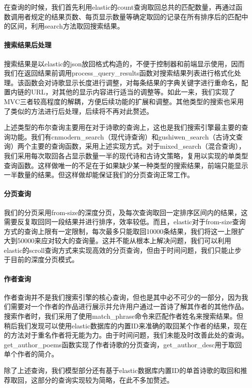 \documentclass[a4paper, 10pt]{article}
\begin{document}
在查询的时候，我们首先利用elastic的count查询取回总共的匹配数量，再通过函数调用者规定的结果页数、每页显示数量等确定取回的记录在所有排序后的匹配中的区间，利用search方法取回搜索结果。

\paragraph*{搜索结果后处理} 搜索结果是以elastic的json放回格式构造的，不便于控制器和前端显示使用，因而我们在返回结果前调用process\_query\_results函数对搜索结果列表进行格式化处理。该函数会对诗歌显示长度进行调整，对每条结果的字典关键字进行重命名，配置内链的URL，对其他的显示内容进行适当的调整等。如此一来，我们实现了MVC三者较高程度的解耦，方便后续功能的扩展和调整。其他类型的搜索也采用了类似的方法进行后处理，后续将不再对此赘述。

上述类型的布尔查询主要用在对于诗歌的查询上，这也是我们搜索引擎最主要的查询功能。我们有cnmodern\_search（现代诗查询）和gushiwen\_search（古诗文查询）两个主要的查询函数，采用上述实现方式。对于mixed\_search（混合查询），我们采用每次取回各占显示数量一半的现代诗和古诗文策略，复用以实现的单类型查询函数。这样做唯一的不足在于如果缺少某一种类型的搜索结果，前端只能显示一半数量的结果。但这样做却能保证我们的分页查询正常工作。

\paragraph*{分页查询} 我们的分页采用from-size的深度分页，及每次查询取回一定排序区间内的结果，这需要反复取回同一段结果并进行排序，效率较低。而且，elastic对于from-size查询方式的查询上限有一定限制，每次最多只能取回10000条结果，我们将这一上限扩大到50000来应对较大的查询量。这并不能从根本上解决问题，我们可以利用elastic的scroll查询方式来实现高效的分页查询，但由于时间问题，我们只能止步于目前的深度分页模式。

\paragraph*{作者查询} 作者查询并不是我们搜索引擎的核心查询，但也是其中必不可少的一部分，因为我们需要对一个作者的作品进行展示并允许用户通过一首诗了解其作者的其他作品。搜索作者时，我们采用了使用match\_phrase命令来匹配作者姓名来搜索结果。但稍后我们发现可以使用elastic数据库的内置ID来准确的取回某个作者的结果，现在的方法对于重名作者将无能为力。由于时间问题，我们未能及时改善此处的查询。get\_author\_poems函数实现了作者诗歌的分页查询，get\_author\_desc用于取回单个作者的简介。

除了上述查询，我们模型部分还有基于elastic数据库内置ID的单首诗歌的取回和推荐取回，这部分的查询实现较为简略，在此不多加赘述。
\end{document}
